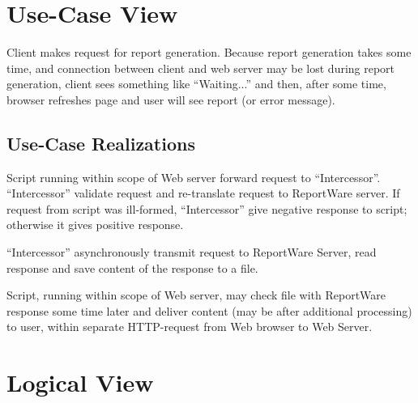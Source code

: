 \documentclass[a4paper,twoside]{article}
\newcommand{\Inter}{{\fontseries{b}\selectfont ``Intercessor''}}
\begin{document}

\section{Use-Case View\label{UCView}}

Client makes request for report generation. Because report generation takes
some time, and connection between client and web server may be lost during
report generation, client sees something like ``Waiting...'' and then, after
some time, browser refreshes page and user will see report (or error message).

\subsection{Use-Case Realizations}


Script running within scope of Web server forward request to \Inter.
\Inter{} validate request and re-translate request to ReportWare server.
If request from script was ill-formed, \Inter{} give negative response to script;
otherwise it gives positive response.

\Inter{} asynchronously transmit request to ReportWare Server, read response and
save content of the response to a file.

Script, running within scope of Web server, may check file with ReportWare response
some time later and deliver content (may be after additional processing) to user,
within separate HTTP-request from Web browser to Web Server.

\section{Logical View\label{LogicalView}}

\end{document}

